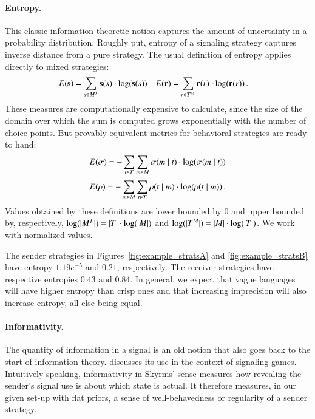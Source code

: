 \paragraph{Entropy.} This classic information-theoretic notion
captures the amount of uncertainty in a probability
distribution. Roughly put, entropy of a signaling strategy captures
inverse distance from a pure strategy. The usual definition of entropy
applies directly to mixed strategies:
\begin{align*}
  E(\mathrm{\mathbf{s}}) & = \sum_{s \in M^T} \mathrm{\mathbf{s}}(s) \cdot
  \log(\mathrm{\mathbf{s}}(s)) & 
  E(\mathrm{\mathbf{r}}) & = \sum_{r \in T^M} \mathrm{\mathbf{r}}(r) \cdot \log(\mathrm{\mathbf{r}}(r)) \,.
\end{align*} 
These measures are computationally expensive to calculate, since the
size of the domain over which the sum is computed grows exponentially
with the number of choice points. But provably equivalent metrics for behavioral
strategies are ready to hand:
\begin{align*}
  E(\sigma) = -\sum_{t \in T} \sum_{m \in M}
  \sigma(m \mid t) \cdot \log(\sigma(m \mid
  t)) 
\end{align*} 
\begin{align*}
  E(\rho) = -\sum_{m \in M} \sum_{t \in T}
  \rho(t \mid m) \cdot \log(\rho(t \mid
  m)) \,. 
\end{align*}
Values obtained by these definitions are lower bounded by $0$ and
upper bounded by, respectively, $\log(|M^T|) = |T|
\cdot \log(|M|)$ and $\log(|T^M|) = |M| \cdot
\log(|T|)$. We work with normalized values. 

The sender strategies in Figures~\ref{fig:example_stratsA} and
\ref{fig:example_stratsB} have entropy $1.19e^{-5}$ and $0.21$,
respectively. The receiver strategies have respective entropies $0.43$
and $0.84$. In general, we expect that vague languages will have
higher entropy than crisp ones and that increasing imprecision will
also increase entropy, all else being equal.



\paragraph{Informativity.} The quantity of information in a signal is
an old notion that also goes back to the start of information theory.
\citet[ch.~3]{Skyrms2010:Signals} discusses its use in the context of
signaling games. Intuitively speaking, informativity in Skyrms' sense
measures how revealing the sender's signal use is about which state is
actual. It therefore measures, in our given set-up with flat priors, a
sense of well-behavedness or regularity of a sender strategy.

